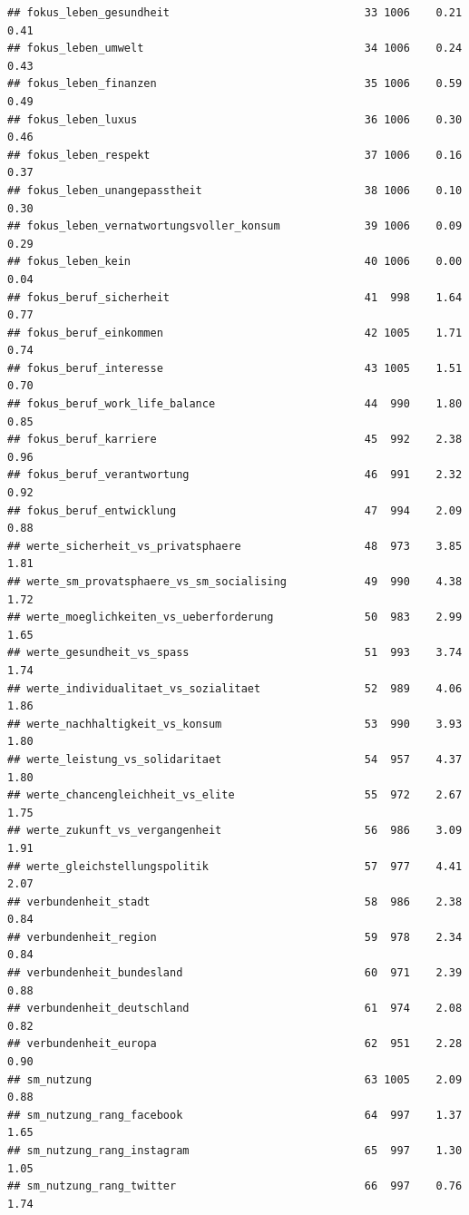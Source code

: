 \documentclass[
]{book}
\begin{document}
\begin{verbatim}
## fokus_leben_gesundheit                              33 1006    0.21   0.41
## fokus_leben_umwelt                                  34 1006    0.24   0.43
## fokus_leben_finanzen                                35 1006    0.59   0.49
## fokus_leben_luxus                                   36 1006    0.30   0.46
## fokus_leben_respekt                                 37 1006    0.16   0.37
## fokus_leben_unangepasstheit                         38 1006    0.10   0.30
## fokus_leben_vernatwortungsvoller_konsum             39 1006    0.09   0.29
## fokus_leben_kein                                    40 1006    0.00   0.04
## fokus_beruf_sicherheit                              41  998    1.64   0.77
## fokus_beruf_einkommen                               42 1005    1.71   0.74
## fokus_beruf_interesse                               43 1005    1.51   0.70
## fokus_beruf_work_life_balance                       44  990    1.80   0.85
## fokus_beruf_karriere                                45  992    2.38   0.96
## fokus_beruf_verantwortung                           46  991    2.32   0.92
## fokus_beruf_entwicklung                             47  994    2.09   0.88
## werte_sicherheit_vs_privatsphaere                   48  973    3.85   1.81
## werte_sm_provatsphaere_vs_sm_socialising            49  990    4.38   1.72
## werte_moeglichkeiten_vs_ueberforderung              50  983    2.99   1.65
## werte_gesundheit_vs_spass                           51  993    3.74   1.74
## werte_individualitaet_vs_sozialitaet                52  989    4.06   1.86
## werte_nachhaltigkeit_vs_konsum                      53  990    3.93   1.80
## werte_leistung_vs_solidaritaet                      54  957    4.37   1.80
## werte_chancengleichheit_vs_elite                    55  972    2.67   1.75
## werte_zukunft_vs_vergangenheit                      56  986    3.09   1.91
## werte_gleichstellungspolitik                        57  977    4.41   2.07
## verbundenheit_stadt                                 58  986    2.38   0.84
## verbundenheit_region                                59  978    2.34   0.84
## verbundenheit_bundesland                            60  971    2.39   0.88
## verbundenheit_deutschland                           61  974    2.08   0.82
## verbundenheit_europa                                62  951    2.28   0.90
## sm_nutzung                                          63 1005    2.09   0.88
## sm_nutzung_rang_facebook                            64  997    1.37   1.65
## sm_nutzung_rang_instagram                           65  997    1.30   1.05
## sm_nutzung_rang_twitter                             66  997    0.76   1.74

\end{verbatim}
\end{document}
